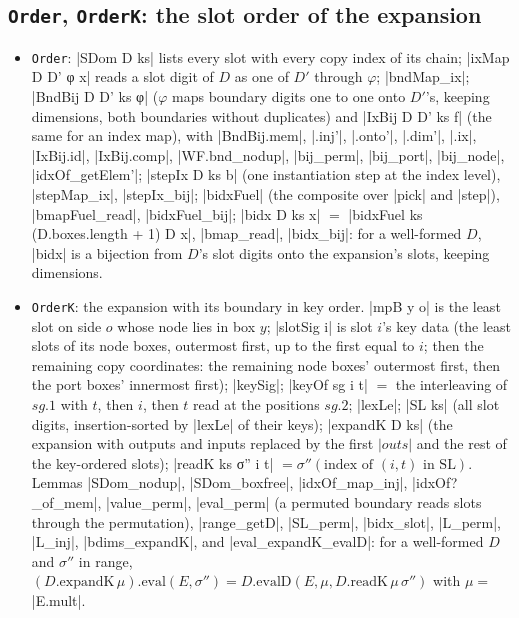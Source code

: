 \subsection{\texttt{Order}, \texttt{OrderK}: the slot order of the expansion}

\begin{itemize}
\item \texttt{Order}: \lean|SDom D ks| lists every slot with every copy index of its chain;
  \leanLLone|ixMap D D' φ x| reads a slot digit of $D$ as one of $D'$ through $\varphi$; \lean|bndMap_ix|;
  \leanLLone|BndBij D D' ks φ| ($\varphi$ maps boundary digits one to one onto $D'$'s, keeping dimensions,
  both boundaries without duplicates) and \lean|IxBij D D' ks f| (the same for an index map), with
  \lean|BndBij.mem|, \lean|.inj'|, \lean|.onto'|, \lean|.dim'|, \lean|.ix|, \lean|IxBij.id|,
  \lean|IxBij.comp|, \lean|WF.bnd_nodup|, \lean|bij_perm|, \lean|bij_port|, \lean|bij_node|,
  \lean|idxOf_getElem'|; \lean|stepIx D ks b| (one instantiation step at the index level),
  \lean|stepMap_ix|, \lean|stepIx_bij|; \lean|bidxFuel| (the composite over \lean|pick| and \lean|step|),
  \lean|bmapFuel_read|, \lean|bidxFuel_bij|; \lean|bidx D ks x| $=$ \lean|bidxFuel ks (D.boxes.length + 1) D x|,
  \lean|bmap_read|, \lean|bidx_bij|: for a well-formed $D$, \lean|bidx| is a bijection from $D$'s slot
  digits onto the expansion's slots, keeping dimensions.
\item \texttt{OrderK}: the expansion with its boundary in key order. \lean|mpB y o| is the least slot
  on side $o$ whose node lies in box $y$; \lean|slotSig i| is slot $i$'s key data (the least slots of
  its node boxes, outermost first, up to the first equal to $i$; then the remaining copy coordinates:
  the remaining node boxes' outermost first, then the port boxes' innermost first); \lean|keySig|;
  \lean|keyOf sg i t| $=$ the interleaving of $sg.1$ with $t$, then $i$, then $t$ read at the positions
  $sg.2$; \lean|lexLe|; \lean|SL ks| (all slot digits, insertion-sorted by \lean|lexLe| of their
  keys); \lean|expandK D ks| (the expansion with outputs and inputs replaced by the first
  $|outs|$ and the rest of the key-ordered slots); \lean|readK ks σ'' i t| $=\sigma''(\text{index of }(i,t)\text{ in SL})$.
  Lemmas \lean|SDom_nodup|, \lean|SDom_boxfree|, \lean|idxOf_map_inj|, \lean|idxOf?_of_mem|,
  \lean|value_perm|, \lean|eval_perm| (a permuted boundary reads slots through the permutation),
  \lean|range_getD|, \lean|SL_perm|, \lean|bidx_slot|, \lean|L_perm|, \lean|L_inj|, \lean|bdims_expandK|,
  and \lean|eval_expandK_evalD|: for a well-formed $D$ and $\sigma''$ in range,
  $(D.\mathrm{expandK}\,\mu).\mathrm{eval}(E,\sigma'')=D.\mathrm{evalD}(E,\mu,D.\mathrm{readK}\,\mu\,\sigma'')$ with
  $\mu=$ \lean|E.mult|.
\end{itemize}


